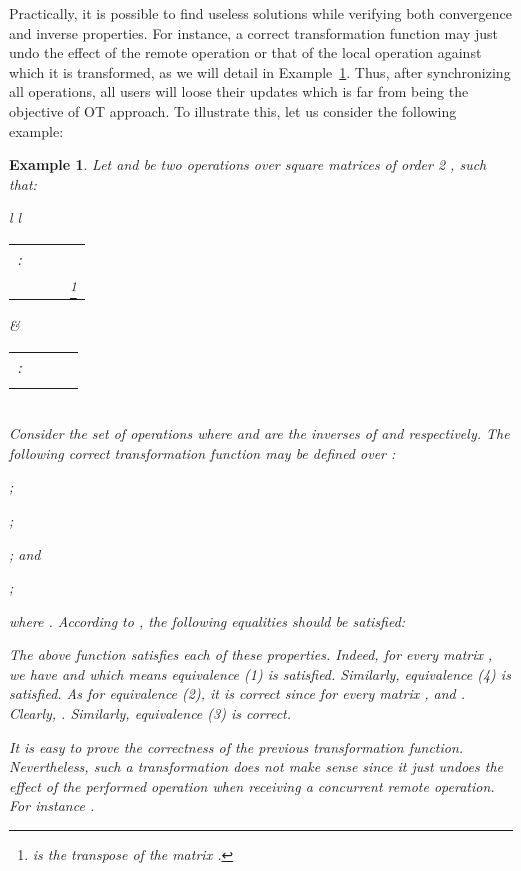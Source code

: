 \documentclass[submission,copyright,creativecommons]{eptcs}
\newtheorem{example}{Example}
\begin{document}
Practically,    it is possible to find   useless solutions  while verifying both convergence and inverse properties. For instance, a correct transformation function may  just  undo the effect of the remote operation or that of the local operation against which it is transformed, as we will detail in  Example~\ref{ex:casBizarre}. Thus, after synchronizing all operations, all users will loose their updates which is far from being the objective of OT approach. To illustrate this, let us consider the following example:   
\begin{example}\label{ex:casBizarre}
Let  and  be two  operations over square matrices of order 2 , such that:\\
\begin{tabular}{l l}
\begin{tabular}{r r r l}
 :  & & &\\
& & &\footnote{ is the transpose of the matrix .}\\
\end{tabular}&
\begin{tabular}{r r r l}
 :& & &\\
& & &\\ 
\end{tabular}
\end{tabular}\\
 
Consider the set of operations  where  and  are the inverses of  and  respectively. The following correct transformation function may be defined over :\begin{inparaenum}[(i)]
\item ;  \item ;
\item ; and  \item ;
\end{inparaenum} where .
According to , the following equalities should be satisfied:\vspace{-.2cm} 



The above  function  satisfies each of these properties. Indeed, for every matrix , we have  and  which means equivalence (1) is satisfied. Similarly, equivalence (4) is satisfied.  
As for equivalence (2), it is correct since for every matrix ,  and . Clearly, .
Similarly,  equivalence (3) is correct. 

It is easy to prove the correctness of the previous transformation function. Nevertheless, such  a transformation does not make sense since it just undoes the effect of the performed operation when receiving a concurrent remote operation. For instance .  
\end{example}   
\end{document}
